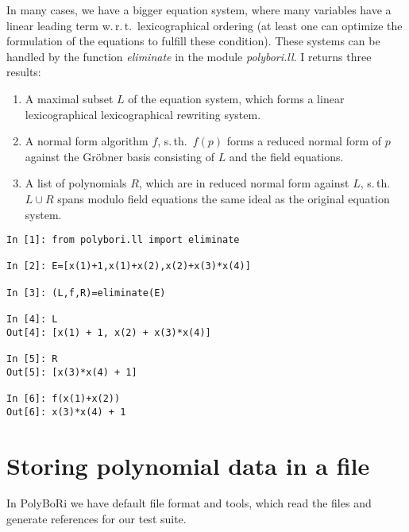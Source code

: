 \documentclass[]{article}
\newcommand{\PolyBoRi}{{\sc PolyBoRi}\xspace}
\newcommand{\Groebner}{Gr\"{o}bner\xspace}
\newcommand{\functionname}[1]{\textit{#1}\xspace}
\newcounter{thm}
\begin{document}
In many cases, we have a bigger equation system, where many variables have a linear leading term w.\,r.\,t.\ lexicographical ordering (at least one can optimize the formulation of the equations to fulfill these condition).
%
These systems can be handled by the function \functionname{eliminate} in the module \functionname{polybori.ll}.
I returns three results:
\begin{enumerate}
    \item A maximal subset $L$ of the equation system, which forms a linear lexicographical lexicographical rewriting system.
    \item A normal form algorithm $f$, s.\,th.\ $f(p)$ forms a reduced normal form of $p$ against the \Groebner basis consisting of $L$ and the field equations.
    \item A list of polynomials $R$, which are in reduced normal form against $L$, s.\,th.\ $L\cup R$ spans modulo field equations the same ideal as the original equation system.
\end{enumerate}

\begin{verbatim}
In [1]: from polybori.ll import eliminate

In [2]: E=[x(1)+1,x(1)+x(2),x(2)+x(3)*x(4)]

In [3]: (L,f,R)=eliminate(E)

In [4]: L
Out[4]: [x(1) + 1, x(2) + x(3)*x(4)]

In [5]: R
Out[5]: [x(3)*x(4) + 1]

In [6]: f(x(1)+x(2))
Out[6]: x(3)*x(4) + 1
\end{verbatim}

\section{Storing polynomial data in a file}

In \PolyBoRi we have default file format and tools, which read the files and generate references for our test suite.
\end{document}
